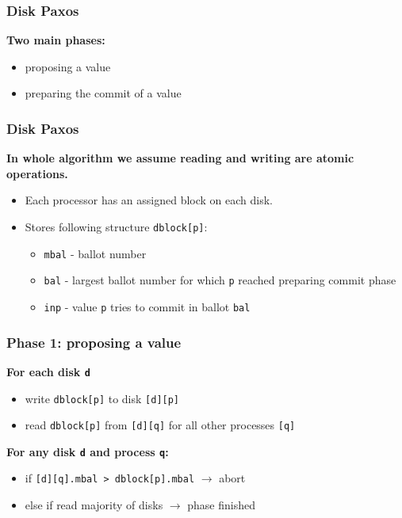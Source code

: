 \documentclass[10pt,utf8]{beamer}
\begin{document}
\begin{frame}
    \frametitle{Disk Paxos}
    \centering
    \textbf{Two main phases:}
    \vspace{0.5cm}
    \begin{itemize}
     \item proposing a value
     \item preparing the commit of a value
    \end{itemize}
\end{frame}


\begin{frame}
    \frametitle{Disk Paxos}
    \centering
    \textbf{In whole algorithm we assume reading and writing are atomic operations.}\\
    \vspace{1cm}
    
    \begin{itemize}
     \item Each processor has an assigned block on each disk.
     \item Stores following structure \texttt{dblock[p]}:
     \begin{itemize}
        \item \texttt{mbal} - ballot number
        \item \texttt{bal} - largest ballot number for which \texttt{p} reached preparing commit phase
        \item \texttt{inp} - value \texttt{p} tries to commit in ballot \texttt{bal}
     \end{itemize}
    \end{itemize}
\end{frame}


\begin{frame}
    \frametitle{Phase 1: proposing a value}
    \centering
    \textbf{For each disk \texttt{d}}
    \vspace{0.5cm}
    \begin{itemize}
        \item write \texttt{dblock[p]} to disk \texttt{[d][p]}
        \item read \texttt{dblock[p]} from \texttt{[d][q]} for all other processes \texttt{[q]}
    \end{itemize}
    
    \vspace{1cm}
    
    \centering
    \textbf{For any disk \texttt{d} and process \texttt{q}:}
    \vspace{0.5cm}
    \begin{itemize}
        \item if \texttt{[d][q].mbal > dblock[p].mbal} $\rightarrow$ abort
        \item else if read majority of disks $\rightarrow$ phase finished
    \end{itemize}
\end{frame}
\end{document}

